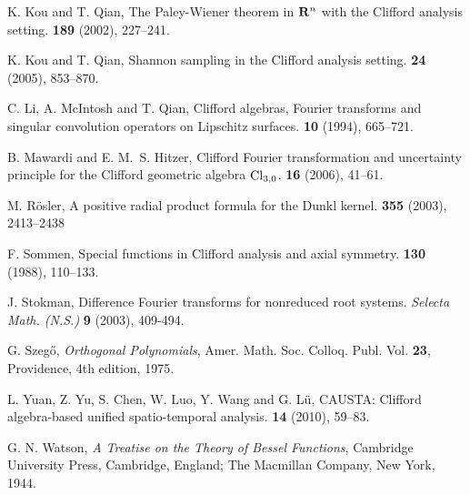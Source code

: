 \documentclass{amsart}
\theoremstyle{remark}
\begin{document}
\begin{thebibliography}{99}
K. Kou and T. Qian,
\newblock The Paley-Wiener theorem in $\bold R\sp n$ with the Clifford analysis setting.
 {\bf 189} (2002), 227--241.

K. Kou and T. Qian,
\newblock Shannon sampling in the Clifford analysis setting.
 {\bf 24} (2005), 853--870.

C. Li, A. McIntosh and T. Qian,
\newblock Clifford algebras, {F}ourier transforms and singular convolution
  operators on {L}ipschitz surfaces.
 {\bf 10} (1994), 665--721.

B. Mawardi and E. M.~S. Hitzer,
\newblock Clifford {F}ourier transformation and uncertainty principle for the
  {C}lifford geometric algebra {${\rm Cl}_{3,0}$}.
 {\bf 16} (2006), 41--61.

M. R{\"o}sler,
\newblock A positive radial product formula for the Dunkl kernel. 
 {\bf 355} (2003), 2413--2438 

F. Sommen,
\newblock Special functions in {C}lifford analysis and axial symmetry.
 {\bf 130} (1988), 110--133.

J. Stokman,
Difference Fourier transforms for nonreduced root systems. {\em Selecta Math. (N.S.)} {\bf 9} (2003), 409-494. 

    G. Szeg\H{o},
    \textit{Orthogonal Polynomials},
    Amer. Math. Soc. Colloq. Publ. Vol. {\bf 23}, Providence, 4th edition, 1975.

L. Yuan, Z. Yu, S. Chen, W. Luo, Y. Wang and G. L\"u,
\newblock CAUSTA: Clifford algebra-based unified spatio-temporal analysis.
 {\bf 14} (2010), 59--83. 

G. N. Watson,
\textit{A Treatise on the Theory of Bessel Functions}, Cambridge University Press, Cambridge, England; 
The Macmillan Company, New York, 1944.

\end{thebibliography}
\end{document}

